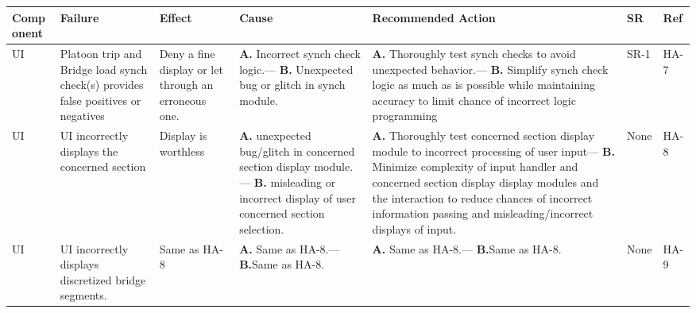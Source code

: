 \documentclass{article}
\begin{document}
  \begin{table}[H]
      \begin{tabular}{|p{} | p{} | p{} | p{} | p{} | p{} | p{}|}
      \toprule
      \textbf{Comp onent} & \textbf{Failure} & \textbf{Effect} & \textbf{Cause} & \textbf{Recommended Action} & \textbf{SR} & \textbf{Ref}\\
  \midrule
      UI & Platoon trip and Bridge load synch check(s) provides false positives or negatives &  Deny a fine display or let through an erroneous one.
    & \textbf{A.} Incorrect synch check logic.---
      \textbf{B.} Unexpected bug or glitch in synch module.
    & \textbf{A.} Thoroughly test synch checks to avoid unexpected behavior.---
      \textbf{B.} Simplify synch check logic as much as is possible while maintaining accuracy to limit chance of incorrect logic programming
    &SR-1&HA-7\\
  \midrule
      UI&UI incorrectly displays the concerned section&Display is worthless& \textbf{A.} unexpected bug/glitch in concerned section display module.---
      \textbf{B.} misleading or incorrect display of user concerned section selection.
    & \textbf{A.} Thoroughly test concerned section display module to incorrect processing of user input---
      \textbf{B.} Minimize complexity of input handler and concerned section display display modules and the interaction to reduce chances of 
      incorrect information passing and misleading/incorrect displays of input.
      &None&HA-8\\
  \midrule
      UI&UI incorrectly displays discretized bridge segments.
      &Same as HA-8&\textbf{A.} Same as HA-8.---
      \textbf{B.}Same as HA-8.
      &\textbf{A.} Same as HA-8.---
      \textbf{B.}Same as HA-8.
      &None&HA-9\\
  \bottomrule
    \end{tabular}
    \end{table}
    \pagebreak
\end{document}
